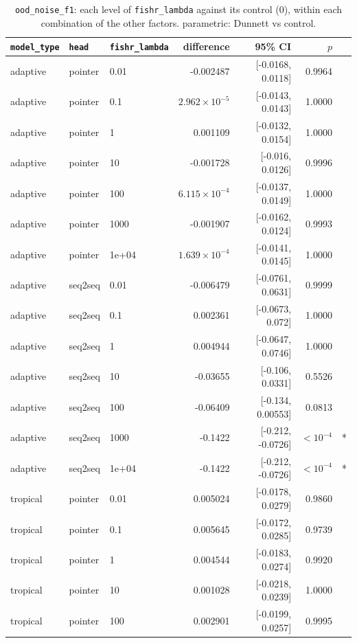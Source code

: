 \documentclass[10pt]{article}
\begin{document}
{\small
\begin{longtable}{lllrrrl}
\caption{\texttt{ood\_noise\_f1}: each level of \texttt{fishr\_lambda} against its control (0), within each combination of the other factors. parametric: Dunnett vs control.}\label{tab:control-ood_noise_f1}\\
\toprule
\texttt{model\_type} & \texttt{head} & \texttt{fishr\_lambda} & difference & 95\% CI & $p$ & \\
\midrule
\endhead
adaptive & pointer & 0.01 & -0.002487 & [-0.0168, 0.0118] & 0.9964 & \\
adaptive & pointer & 0.1 & $2.962\times10^{-5}$ & [-0.0143, 0.0143] & 1.0000 & \\
adaptive & pointer & 1 & 0.001109 & [-0.0132, 0.0154] & 1.0000 & \\
adaptive & pointer & 10 & -0.001728 & [-0.016, 0.0126] & 0.9996 & \\
adaptive & pointer & 100 & $6.115\times10^{-4}$ & [-0.0137, 0.0149] & 1.0000 & \\
adaptive & pointer & 1000 & -0.001907 & [-0.0162, 0.0124] & 0.9993 & \\
adaptive & pointer & 1e+04 & $1.639\times10^{-4}$ & [-0.0141, 0.0145] & 1.0000 & \\
adaptive & seq2seq & 0.01 & -0.006479 & [-0.0761, 0.0631] & 0.9999 & \\
adaptive & seq2seq & 0.1 & 0.002361 & [-0.0673, 0.072] & 1.0000 & \\
adaptive & seq2seq & 1 & 0.004944 & [-0.0647, 0.0746] & 1.0000 & \\
adaptive & seq2seq & 10 & -0.03655 & [-0.106, 0.0331] & 0.5526 & \\
adaptive & seq2seq & 100 & -0.06409 & [-0.134, 0.00553] & 0.0813 & \\
adaptive & seq2seq & 1000 & -0.1422 & [-0.212, -0.0726] & $<10^{-4}$ & *\\
adaptive & seq2seq & 1e+04 & -0.1422 & [-0.212, -0.0726] & $<10^{-4}$ & *\\
tropical & pointer & 0.01 & 0.005024 & [-0.0178, 0.0279] & 0.9860 & \\
tropical & pointer & 0.1 & 0.005645 & [-0.0172, 0.0285] & 0.9739 & \\
tropical & pointer & 1 & 0.004544 & [-0.0183, 0.0274] & 0.9920 & \\
tropical & pointer & 10 & 0.001028 & [-0.0218, 0.0239] & 1.0000 & \\
tropical & pointer & 100 & 0.002901 & [-0.0199, 0.0257] & 0.9995 & \\

\end{longtable}}
\end{document}
